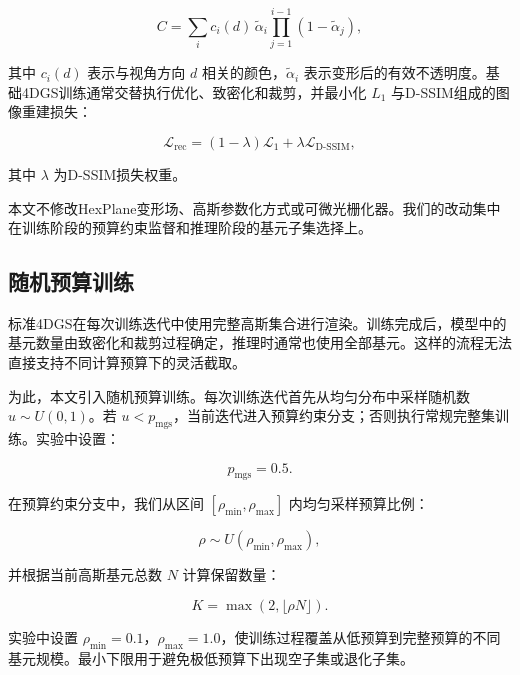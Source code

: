 \documentclass[sn-mathphys]{sn-jnl}
\begin{document}
\begin{equation}
C =
\sum_i c_i(d)\,\tilde{\alpha}_i
\prod_{j=1}^{i-1}(1-\tilde{\alpha}_j),
\label{eq:rendering}
\end{equation}

其中 $c_i(d)$ 表示与视角方向 $d$ 相关的颜色，$\tilde{\alpha}_i$ 表示变形后的有效不透明度。基础4DGS训练通常交替执行优化、致密化和裁剪，并最小化 $L_1$ 与D-SSIM组成的图像重建损失：

\begin{equation}
\mathcal{L}_{\mathrm{rec}}
=
(1-\lambda)\mathcal{L}_1
+
\lambda \mathcal{L}_{\mathrm{D\text{-}SSIM}},
\label{eq:loss}
\end{equation}

其中 $\lambda$ 为D-SSIM损失权重。

本文不修改HexPlane变形场、高斯参数化方式或可微光栅化器。我们的改动集中在训练阶段的预算约束监督和推理阶段的基元子集选择上。

\subsection{随机预算训练}
\label{sec:sbt}

标准4DGS在每次训练迭代中使用完整高斯集合进行渲染。训练完成后，模型中的基元数量由致密化和裁剪过程确定，推理时通常也使用全部基元。这样的流程无法直接支持不同计算预算下的灵活截取。

为此，本文引入随机预算训练。每次训练迭代首先从均匀分布中采样随机数 $u \sim U(0,1)$。若 $u < p_{\mathrm{mgs}}$，当前迭代进入预算约束分支；否则执行常规完整集训练。实验中设置：

\begin{equation}
p_{\mathrm{mgs}} = 0.5.
\end{equation}

在预算约束分支中，我们从区间 $[\rho_{\min}, \rho_{\max}]$ 内均匀采样预算比例：

\begin{equation}
\rho \sim U(\rho_{\min}, \rho_{\max}),
\end{equation}

并根据当前高斯基元总数 $N$ 计算保留数量：

\begin{equation}
K = \max(2, \lfloor \rho N \rfloor).
\end{equation}

实验中设置 $\rho_{\min}=0.1$，$\rho_{\max}=1.0$，使训练过程覆盖从低预算到完整预算的不同基元规模。最小下限用于避免极低预算下出现空子集或退化子集。
\end{document}
